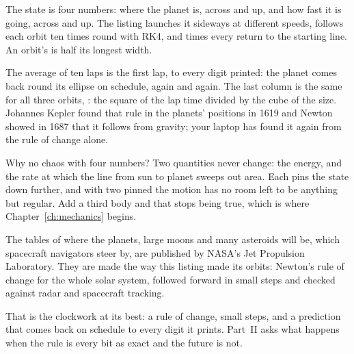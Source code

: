 
\noindent
The state is four numbers: where the planet is, across and up, and how fast
it is going, across and up. The listing launches it sideways at
 different speeds, follows each orbit ten times round
with RK4, and times every return to the starting line. An orbit's
 is half its longest width.


\noindent
The average of ten laps is the first lap, to every digit printed: the planet
comes back round its ellipse on schedule, again and again. The last column is
the same for all three orbits, : the square of the lap
time divided by the cube of the size. Johannes Kepler found that rule in the
planets' positions in 1619 and Newton showed in 1687 that it follows from
gravity; your laptop has found it again from the rule of change alone.

Why no chaos with four numbers? Two quantities never change: the energy, and
the rate at which the line from sun to planet sweeps out area. Each pins the
state down further, and with two pinned the motion has no room left to be
anything but regular. Add a third body and that stops being true, which is
where Chapter~\ref{ch:mechanics} begins.

\begin{worldbox}
The tables of where the planets, large moons and many asteroids will be,
which spacecraft navigators steer by, are published by NASA's Jet Propulsion
Laboratory. They are made the way this listing made its orbits: Newton's rule
of change for the whole solar system, followed forward in small steps and
checked against radar and spacecraft tracking.
\end{worldbox}

\noindent
That is the clockwork at its best: a rule of change, small steps, and a
prediction that comes back on schedule to every digit it prints. Part~II asks
what happens when the rule is every bit as exact and the future is not.

